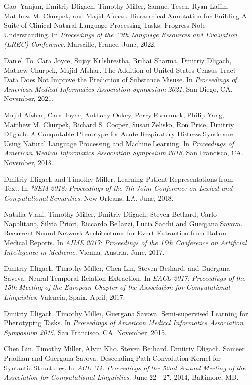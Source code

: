 \documentclass[letterpaper]{article}
\renewenvironment{itemize}{
  \begin{list}{}{
    \setlength{\leftmargin}{1.5em}
  }
}{
  \end{list}
}
\begin{document}
\begin{itemize}
\item Gao, Yanjun, Dmitriy Dligach, Timothy Miller, Samuel Tesch, Ryan Laffin, Matthew M. Churpek, and Majid Afshar. Hierarchical Annotation for Building A Suite of Clinical Natural Language Processing Tasks: Progress Note Understanding. In \emph{Proceedings of the 13th Language Resources and Evaluation (LREC) Conference}. Marseille, France. June, 2022.
\item Daniel To, Cara Joyce, Sujay Kulshrestha, Brihat Sharma, Dmitriy Dligach, Mathew Churpek, Majid Afshar. The Addition of United States Census-Tract Data Does Not Improve the Prediction of Substance Misuse. In \emph{Proceedings of American Medical Informatics Association Symposium 2021}. San Diego, CA. November, 2021.
\item Majid Afshar, Cara Joyce, Anthony Oakey, Perry Formanek, Philip Yang, Matthew M. Churpek, Richard S. Cooper, Susan Zelisko, Ron Price, Dmitriy Dligach. A Computable Phenotype for Acute Respiratory Distress Syndrome Using Natural Language Processing and Machine Learning. In \emph{Proceedings of American Medical Informatics Association Symposium 2018}. San Francisco, CA. November, 2018.
\item Dmitriy Dligach and Timothy Miller. Learning Patient Representations from Text. In \emph{*SEM 2018: Proceedings of the 7th Joint Conference on Lexical and Computational Semantics}. New Orleans, LA. June, 2018.
\item Natalia Viani, Timothy Miller, Dmitriy Dligach, Steven Bethard, Carlo Napolitano, Silvia Priori, Riccardo Bellazzi, Lucia Sacchi and Guergana Savova. Recurrent Neural Network Architectures for Event Extraction from Italian Medical Reports. In \emph{AIME 2017: Proceedings of the 16th Conference on Artificial Intelligence in Medicine}. Vienna, Austria. June, 2017.
\item Dmitriy Dligach, Timothy Miller, Chen Lin, Steven Bethard, and Guergana Savova. Neural Temporal Relation Extraction. In \emph{EACL 2017: Proceedings of the 15th Meeting of the European Chapter of the Association
for Computational Linguistics}. Valencia, Spain. April, 2017.
\item Dmitriy Dligach, Timothy Miller, Guergana Savova. Semi-supervised Learning for Phenotyping Tasks. In \emph{Proceedings of American Medical Informatics Association Symposium 2015}. San Francisco, CA. November, 2015.
\item Chen Lin, Timothy Miller, Alvin Kho, Steven Bethard, Dmitriy Dligach, Sameer Pradhan and Guergana Savova. Descending-Path Convolution Kernel for Syntactic Structures. In \emph {ACL '14: Proceedings of the 52nd Annual Meeting of the Association for Computational Linguistics}. June 22 - 27, 2014, Baltimore, MD.

\end{itemize}
\end{document}
